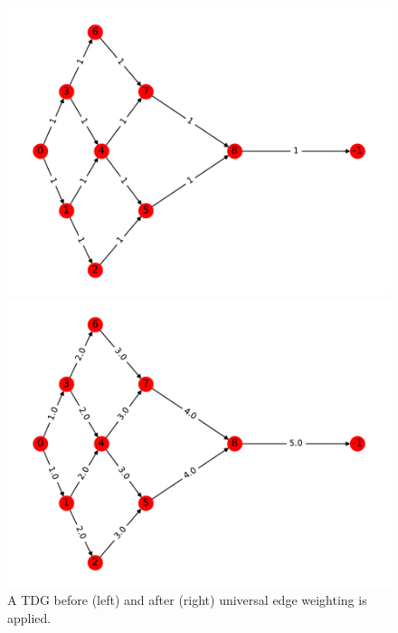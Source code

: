 \documentclass[times,final]{elsarticle}
\begin{document}
\begin{figure}[H]
  \begin{minipage}[c]{0.5\textwidth}
    \centering
    \includegraphics[scale=0.5]{../figures/G_pre_universal.pdf}
  \end{minipage}
  \begin{minipage}[c]{0.5\textwidth}
    \centering
    \includegraphics[scale=0.5]{../figures/G_universal.pdf}
  \end{minipage}
  \caption{A TDG before (left) and after (right) universal edge weighting is applied.}
   \label{universal}
\end{figure}

\end{document}
